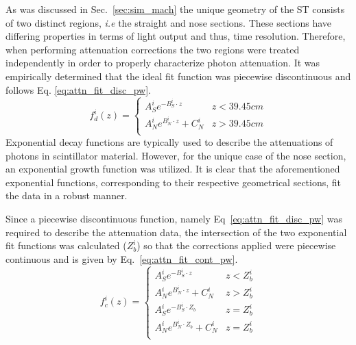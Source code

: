 As was discussed in Sec.~\ref{sec:sim_mach} the unique geometry of the ST consists of two distinct regions, \textit{i.e} the straight and nose sections.  These sections have differing properties in terms of light output and thus, time resolution.  Therefore, when performing attenuation corrections the two regions were treated independently in order to properly characterize photon attenuation.  It was empirically determined that the ideal fit function was piecewise discontinuous and follows Eq. \ref{eq:attn_fit_disc_pw}.
	\begin{equation} \label{eq:attn_fit_disc_pw}
	f_{d}^{i}(z) = 
	\begin{cases} 
		A^{i}_{S}e^{-B^{i}_{S} \cdot z} & z < 39.45 cm \\
		A^{i}_{N}e^{B^{i}_{N} \cdot z} + C^{i}_{N} & z > 39.45 cm \\
	\end{cases}
	\end{equation}
Exponential decay functions are typically used to describe the attenuations of photons in scintillator material.  However, for the unique case of the nose section, an exponential growth function was utilized.  It is clear that the aforementioned exponential functions, corresponding to their respective geometrical sections, fit the data in a robust manner. 

Since a piecewise discontinuous function, namely Eq~\ref{eq:attn_fit_disc_pw} was required to describe the attenuation data, the intersection of the two exponential fit functions was calculated ($Z^{i}_{b}$) so that the corrections applied were piecewise continuous and is given by Eq.~\ref{eq:attn_fit_cont_pw}. 
	\begin{equation} \label{eq:attn_fit_cont_pw}
	f_{c}^{i}(z) = 
	\begin{cases} 
		A^{i}_{S}e^{-B^{i}_{S} \cdot z} & z < Z^{i}_{b} \\
		A^{i}_{N}e^{B^{i}_{N} \cdot z} + C^{i}_{N} & z > Z^{i}_{b} \\
		A^{i}_{S}e^{-B^{i}_{S} \cdot Z_{b}} & z = Z^{i}_{b} \\
		A^{i}_{N}e^{B^{i}_{N} \cdot Z_{b}} + C^{i}_{N} & z = Z^{i}_{b} \\
	\end{cases}
	\end{equation}

